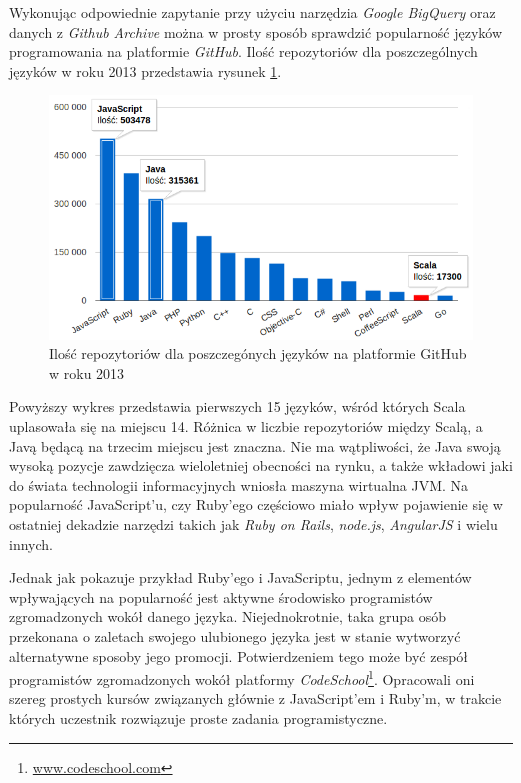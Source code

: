 \documentclass[brudnopis]{xmgr}
\begin{document}
Wykonując odpowiednie zapytanie przy użyciu narzędzia \textit{Google BigQuery} oraz danych z \textit{Github Archive} można w prosty sposób sprawdzić popularność języków programowania na platformie \textit{GitHub}. Ilość repozytoriów dla poszczególnych języków w roku 2013  przedstawia rysunek \ref{RYS.1}. 

\begin{figure}[!tbh]
\centering 
\includegraphics[width=.95\hsize]{fig/top_github_languages_2013}
\caption{Ilość repozytoriów dla poszczegónych języków na platformie GitHub w roku 2013 \label{RYS.1}}
\end{figure}

Powyższy wykres przedstawia pierwszych 15 języków, wśród których Scala uplasowała się na miejscu 14. Różnica w liczbie repozytoriów między Scalą, a Javą będącą na trzecim miejscu jest znaczna. Nie ma wątpliwości, że Java swoją wysoką pozycje zawdzięcza wieloletniej obecności na rynku, a także wkładowi jaki do świata technologii informacyjnych wniosła maszyna wirtualna JVM. Na popularność JavaScript'u, czy Ruby'ego częściowo miało wpływ pojawienie się w ostatniej dekadzie narzędzi takich jak \textit{Ruby on Rails}, \textit{node.js}, \textit{AngularJS} i wielu innych. 

Jednak jak pokazuje przykład Ruby'ego i JavaScriptu, jednym z elementów wpływających na popularność jest aktywne środowisko programistów zgromadzonych wokół danego języka. Niejednokrotnie, taka grupa osób przekonana o zaletach swojego ulubionego języka jest w stanie wytworzyć alternatywne sposoby jego promocji. Potwierdzeniem tego może być zespół programistów zgromadzonych wokół platformy \textit{CodeSchool}\footnote{\url{www.codeschool.com}}. Opracowali oni szereg prostych kursów związanych głównie z JavaScript'em i Ruby'm, w trakcie których uczestnik rozwiązuje proste zadania programistyczne. 
\end{document}
